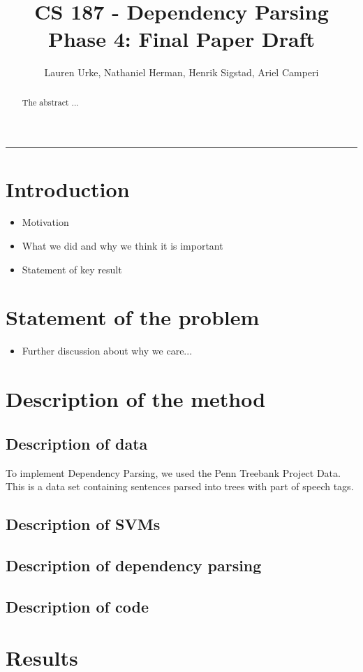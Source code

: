 \documentclass[12pt,fleqn]{article}
\title{CS 187 - Dependency Parsing\\Phase 4: Final Paper Draft}
\author{Lauren Urke, Nathaniel Herman, Henrik Sigstad, Ariel Camperi}
\date{}
\begin{document}
    \maketitle
    \hrule
\begin{abstract}
The abstract ...
\end{abstract}
\section{Introduction}
\begin{itemize}
\item Motivation
\item What we did and why we think it is important
\item Statement of key result
\end{itemize}

\section{Statement of the problem}
\begin{itemize}
\item Further discussion about why we care...
\end{itemize}

\section{Description of the method}
\subsection{Description of data}
To implement Dependency Parsing, we used the Penn Treebank Project Data. This is a data set containing sentences parsed into trees with part of speech tags. 

\subsection{Description of SVMs}
\subsection{Description of dependency parsing}
\subsection{Description of code}

\section{Results}
\end{document}
